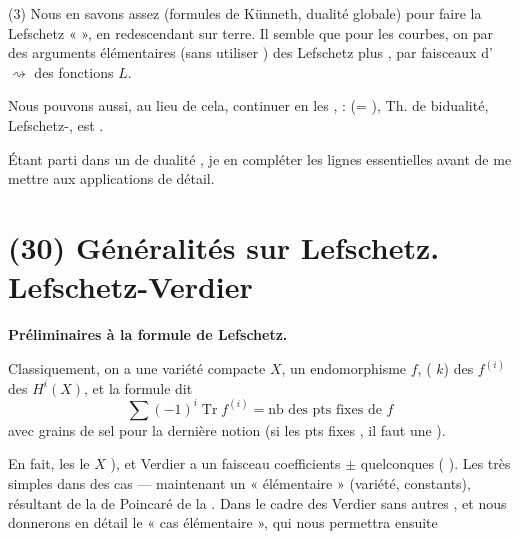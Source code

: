 \documentclass[11pt,a4paper]{article}
\begin{document}

(3) Nous en savons assez (formules de Künneth, dualité globale) pour faire la
Lefschetz «  », en redescendant sur terre. Il semble
que pour les courbes, on  par des arguments élémentaires
(sans utiliser ) des Lefschetz plus \ill{}, par
faisceaux d' $\rightsquigarrow$ 
des fonctions $L$.

Nous pouvons aussi, au lieu de cela, continuer en  les
,  :  (= ), Th. de bidualité, Lefschetz-\ill{},
\struck{\ill{}}  
\ill{} est .

Étant parti dans un  de dualité , je
 en compléter les lignes essentielles avant de
 me mettre aux applications de détail.

\section{(30) Généralités sur Lefschetz.  Lefschetz-Verdier}

\textbf{Préliminaires à la formule de \struck{\ill{}} Lefschetz.}

Classiquement, on a une variété compacte $X$, un endomorphisme $f$,
 (\ill{} \ill{} \ill{} \ill{} $k$)  des $f^{(i)}$ des $H^i(X)$, et la formule dit
\[
  \sum (-1)^i \operatorname{Tr} f^{(i)} = \text{nb des pts fixes de } f
\]
avec grains de sel pour la dernière notion (si les pts fixes , il faut une  \ill{} \ill{}).

En fait, les    le \ill{} \ill{} \ill{} \ill{} $X$ \ill{}
\ill{} \ill{} \ill{} \ill{} \ill{}), et Verdier a \ill{}  \ill{} \ill{} \ill{} \ill{} un
faisceau  \ill{} \ill{} \ill{} \ill{} 
\ill{} coefficients $\pm$ quelconques (\ill{} \ill{} \ill{}
). Les \ill{} \ill{} très simples dans des cas
\ill{} \ill{} \ill{} \ill{} \ill{} \ill{} \ill{} \ill{} — maintenant un
\ill{} \ill{} « élémentaire » (variété, 
 constants), \ill{} résultant de la
 de Poincaré \ill{} \ill{} \ill{} \ill{} \ill{} \ill{}
de la \ill{} \ill{} \ill{} \ill{} \ill{}. Dans le cadre des
  \ill{} Verdier \ill{} sans autres \ill{}, et nous donnerons
  \ill{} en détail \ill{} le
« cas élémentaire », qui nous permettra ensuite
\end{document}
